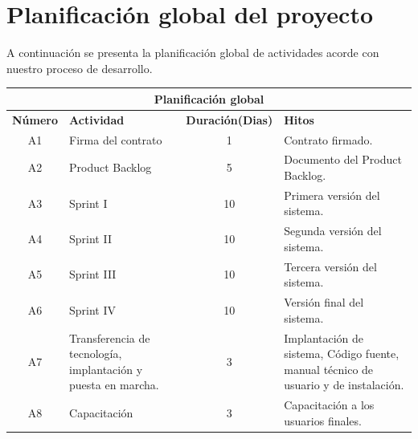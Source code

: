 \documentclass[11pt,letterpaper]{report}
\begin{document}
\section{Planificación global del proyecto}
A continuación se presenta la planificación global de actividades acorde con nuestro proceso de desarrollo.
\begin{center}
\begin{tabular}{|c|p{4.5cm}|c|p{6cm}|}
	\hline
	\multicolumn{4}{|c|}{\textbf{Planificación global}} \\
	\hline
	\textbf{ Número} & \textbf{Actividad} & \textbf{Duración(Dias)} & \textbf{Hitos} \\ \hline
	A1 & Firma del contrato & 1 & Contrato firmado. \\ \hline
	A2 & Product Backlog & 5 & Documento del Product Backlog. \\ \hline
	A3 & Sprint I & 10 & Primera versión del sistema. \\ \hline
	A4 & Sprint II & 10 & Segunda versión del sistema. \\ \hline
	A5 & Sprint III & 10 & Tercera versión del sistema. \\ \hline
	A6 & Sprint IV & 10 & Versión final del sistema. \\ \hline
	A7 & Transferencia de tecnología, implantación y puesta en marcha. & 3 & Implantación de sistema, Código fuente, manual técnico  de usuario y de instalación. \\  \hline
	A8 & Capacitación & 3 &  Capacitación a los usuarios finales.\\ \hline
\end{tabular}
\end{center}
\end{document}
